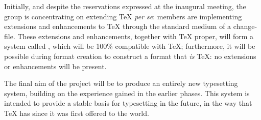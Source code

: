 \begin{changemargin}{-1cm}{-1cm}
Initially, and despite the reservations expressed at the inaugural meeting,
the group is concentrating on extending \TeX{} \emph{per se}: members are
implementing extensions and enhancements to \TeX{} through the standard
medium of a change-file.  These extensions and enhancements, together
with \TeX{} proper, will form a system called \eTeX{}, which will be 100\%
compatible with \TeX{}; furthermore, it will be possible during format
creation to construct a format that \emph{is} \TeX{}: no extensions or
enhancements will be present.

The final aim of the project will be to produce an entirely new
typesetting system, building on the experience gained in the earlier
phases.  This system is intended to provide a stable basis
for typesetting in the future, in the way that \TeX{} has since it was
first offered to the world.



\end{changemargin}

